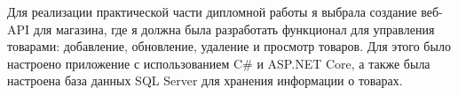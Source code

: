 \documentclass[a4paper,12pt]{report}
\begin{document}
Для реализации практической части дипломной работы я выбрала создание веб-\ac{API} для магазина, где я должна была разработать 
функционал для управления товарами: добавление, обновление, удаление и просмотр товаров. Для этого было настроено приложение 
с использованием C\# и ASP.NET Core, а также была настроена база данных \ac{SQL} Server для хранения информации о товарах.

\newpage
{}




\appendix

\renewcommand{\thechapter}{\arabic{chapter}}

\setcounter{chapter}{1}
\end{document}
